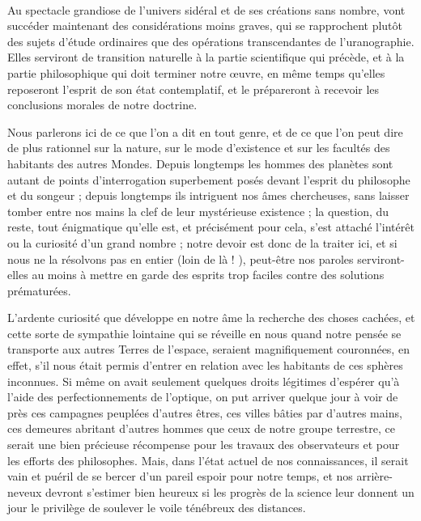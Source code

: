 \documentclass[a4paper, 11pt, oneside]{article}
\begin{document}
\paragraph{}
Au spectacle grandiose de l'univers sidéral et de ses créations sans nombre, vont succéder maintenant des considérations moins graves, qui se rapprochent plutôt des sujets d'étude ordinaires que des opérations transcendantes de l'uranographie. Elles serviront de transition naturelle à la partie scientifique qui précède, et à la partie philosophique qui doit terminer notre œuvre, en même temps qu'elles reposeront l'esprit de son état contemplatif, et le prépareront à recevoir les conclusions morales de notre doctrine.

Nous parlerons ici de ce que l'on a dit en tout genre, et de ce que l'on peut dire de plus rationnel sur la nature, sur le mode d'existence et sur les facultés des habitants des autres Mondes. Depuis longtemps les hommes des planètes sont autant de points d'interrogation superbement posés devant l'esprit du philosophe et du songeur ; depuis longtemps ils intriguent nos âmes chercheuses, sans laisser tomber entre nos mains la clef de leur mystérieuse existence ; la question, du reste, tout énigmatique qu'elle est, et précisément pour cela, s'est attaché l'intérêt ou la curiosité d'un grand nombre ; notre devoir est donc de la traiter ici, et si nous ne la résolvons pas en entier (loin de là ! ), peut-être nos paroles serviront-elles au moins à mettre en garde des esprits trop faciles contre des solutions prématurées.

L'ardente curiosité que développe en notre âme la recherche des choses cachées, et cette sorte de sympathie lointaine qui se réveille en nous quand notre pensée se transporte aux autres Terres de l'espace, seraient magnifiquement couronnées, en effet, s'il nous était permis d'entrer en relation avec les habitants de ces sphères inconnues. Si même on avait seulement quelques droits légitimes d'espérer qu'à l'aide des perfectionnements de l'optique, on put arriver quelque jour à voir de près ces campagnes peuplées d'autres êtres, ces villes bâties par d'autres mains, ces demeures abritant d'autres hommes que ceux de notre groupe terrestre, ce serait une bien précieuse récompense pour les travaux des observateurs et pour les efforts des philosophes. Mais, dans l'état actuel de nos connaissances, il serait vain et puéril de se bercer d'un pareil espoir pour notre temps, et nos arrière-neveux devront s'estimer bien heureux si les progrès de la science leur donnent un jour le privilège de soulever le voile ténébreux des distances.
\end{document}
